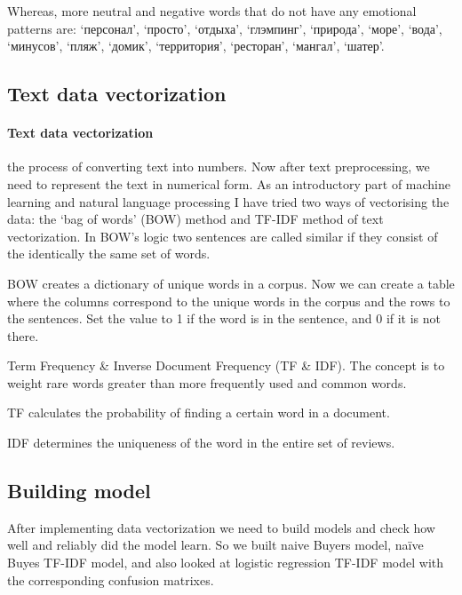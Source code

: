 \documentclass{article}
\begin{document}
Whereas, more neutral and negative words that do not have any emotional patterns are:  ‘персонал’, ‘просто’, ‘отдыха’, ‘глэмпинг’, ‘природа’, ‘море’, ‘вода’, ‘минусов’, ‘пляж’, ‘домик’, ‘территория’, ‘ресторан’, ‘мангал’, ‘шатер’. 

\subsection{Text data vectorization}
\setcounter{section}{9}
\paragraph{Text data vectorization} the process of converting text into numbers. 
\newline\newline
Now after text preprocessing, we need to represent the text in numerical form. As an introductory part of machine learning and natural language processing I have tried two ways of vectorising the data: the ‘bag of words’ (BOW) method and TF-IDF method of text vectorization.  In BOW’s logic two sentences are called similar if they consist of the identically the same set of words.

BOW creates a dictionary of unique words in a corpus. Now we can create a table where the columns correspond to the unique words in the corpus and the rows to the sentences. Set the value to 1 if the word is in the sentence, and 0 if it is not there.

Term Frequency & Inverse Document Frequency (TF & IDF). The concept is to weight rare words greater than more frequently used and common words. 

TF calculates the probability of finding a certain word in a document. 

IDF determines the uniqueness of the word in the entire set of reviews.

\subsection{Building model}
\setcounter{section}{9}
After implementing data vectorization we need to build models and check how well and reliably did the model learn. So we built naive Buyers model, naïve Buyes TF-IDF model, and also looked at logistic regression TF-IDF model with the corresponding confusion matrixes.

\newpage
\end{document}

